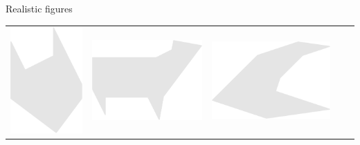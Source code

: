 \documentclass[14pt]{beamer}
\begin{document}
\begin{frame}{Realistic figures}
\begin{center}
{\begin{tabular}{ccccc}
                \includegraphics[scale=0.20]{figures/figure026ao.pdf} &
                \;\;\includegraphics[scale=0.20]{figures/figure026x.pdf} &
                \!\!\!\!\includegraphics[scale=0.20]{figures/figure026ag.pdf} &

\end{tabular}}
\end{center}
\end{frame}
\end{document}

